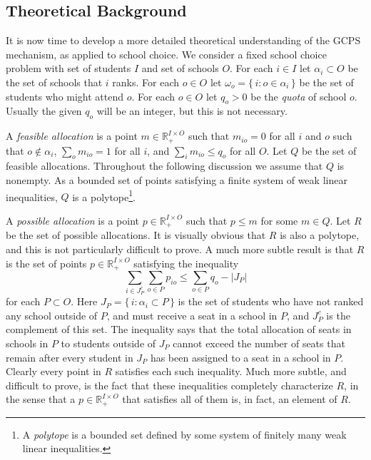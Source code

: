 \documentclass[12pt]{article}
\theoremstyle{definition}
\renewcommand{\Re}{\mathbb{R}}
\begin{document}
\begin{appendix}
\subsection{Theoretical Background}

It is now time to develop a more detailed theoretical understanding of
the GCPS mechanism, as applied to school choice.  We consider a fixed
school choice problem with set of students $I$ and set of schools $O$.
For each $i \in I$ let $\alpha_i \subset O$ be the set of schools that
$i$ ranks. For each $o \in O$ let $\omega_o = \{\, i : o \in \alpha_i
\,\}$ be the set of students who might attend $o$. For each $o \in O$
let $q_o > 0$ be the \emph{quota} of school $o$.  Usually the given
$q_o$ will be an integer, but this is not necessary.

A \emph{feasible allocation} is a point $m \in \Re^{I \times O}_+$
such that $m_{io} = 0$ for all $i$ and $o$ such that $o \notin
\alpha_i$, $\sum_o m_{io} = 1$ for all $i$, and $\sum_i m_{io} \le
q_o$ for all $O$. Let $Q$ be the set of feasible allocations.
Throughout the following discussion we assume that $Q$ is nonempty.
As a bounded set of points satisfying a finite system of weak linear
inequalities, $Q$ is a polytope\footnote{A \emph{polytope} is a
bounded set defined by some system of finitely many weak linear
inequalities.}.

A \emph{possible allocation} is a point $p \in \Re^{I \times O}_+$
such that $p \le m$ for some $m \in Q$.  Let $R$ be the set of
possible allocations.  It is visually obvious that $R$ is also a
polytope, and this is not particularly difficult to prove.  A much
more subtle result is that $R$ is the set of points $p \in \Re^{I
  \times O}_+$ satisfying the inequality
$$\sum_{i \in J_P^c}\sum_{o \in P} p_{io} \le \sum_{o \in P} q_o -
|J_P|$$ for each $P \subset O$.  Here $J_P = \{\, i : \alpha_i \subset
P \,\}$ is the set of students who have not ranked any school outside
of $P$, and must receive a seat in a school in $P$, and $J_P^c$ is the
complement of this set.  The inequality says that the total allocation
of seats in schools in $P$ to students outside of $J_P$ cannot exceed
the number of seats that remain after every student in $J_P$ has been
assigned to a seat in a school in $P$.  Clearly every point in $R$
satisfies each such inequality.  Much more subtle, and difficult to
prove, is the fact that these inequalities completely characterize
$R$, in the sense that a $p \in \Re^{I \times O}_+$ that satisfies all
of them is, in fact, an element of $R$.


\end{appendix}
\end{document}

